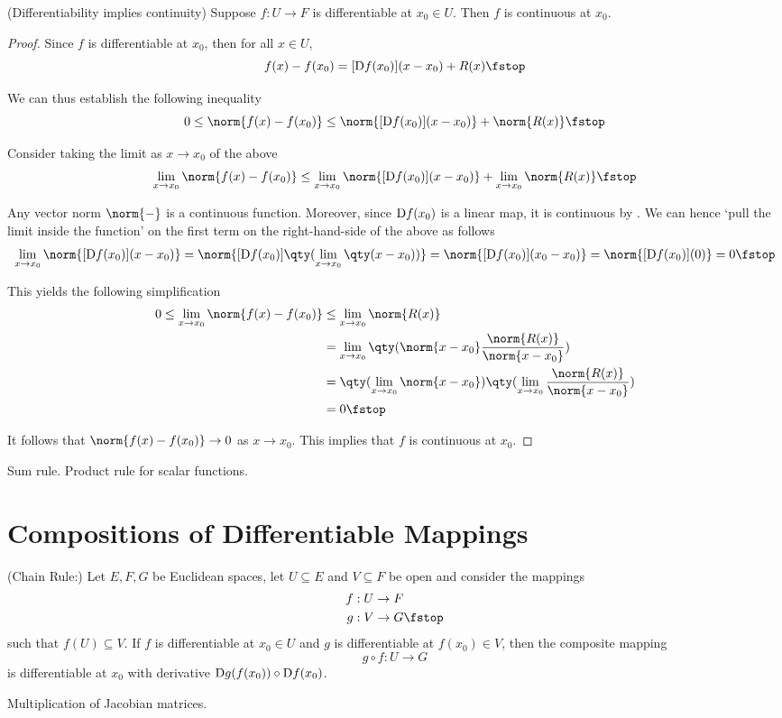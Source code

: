 \begin{theorem}
  (Differentiability implies continuity) Suppose \( f:U\to F \) is differentiable at \( x_0\in U \). Then \( f \) is continuous at \( x_0 \).
\end{theorem}
\begin{proof}
  Since \( f \) is differentiable at \( x_0 \), then for all \( x\in U \),
  \[ f(x)-f(x_0)=[\D f(x_0)](x-x_0)+R(x)\fstop \]

  We can thus establish the following inequality
  \[ 0\leq\norm{f(x)-f(x_0)}\leq\norm{[\D f(x_0)](x-x_0)}+\norm{R(x)}\fstop \]

  Consider taking the limit as \( x\to x_0 \) of the above
  \begin{equation*}
    \lim_{x\to x_0}\norm{f(x)-f(x_0)}\leq \lim_{x\to x_0}\norm{[\D f(x_0)](x-x_0)}+\lim_{x\to x_0}\norm{R(x)}\fstop
  \end{equation*}

  Any vector norm \( \norm{-} \) is a continuous function. Moreover, since \( \text{D} f(x_0) \) is a linear map, it is continuous by . We can hence `pull the limit inside the function' on the first term on the right-hand-side of the above as follows
  \[ \lim_{x\to x_0}\norm{[\D f(x_0)](x-x_0)}=\norm{[\D f(x_0)]\qty(\lim_{x\to x_0}\qty(x-x_0))}=\norm{[\D f(x_0)](x_0-x_0)}=\norm{[\D f(x_0)](0)}=0\fstop \]

  This yields the following simplification
  \begin{align*}
    0\leq \lim_{x\to x_0}\norm{f(x)-f(x_0)}&\leq \lim_{x\to x_0}\norm{R(x)}\\
    &= \lim_{x\to x_0}\qty(\norm{x-x_0}\frac{\norm{R(x)}}{\norm{x-x_0}})\\
    &= \qty(\lim_{x\to x_0}\norm{x-x_0})\qty(\lim_{x\to x_0}\frac{\norm{R(x)}}{\norm{x-x_0}})\\
    &= 0\fstop
  \end{align*}

  It follows that \( \norm{f(x)-f(x_0)}\to 0 \) as \( x\to x_0 \). This implies that \( f \) is continuous at \( x_0\).
\end{proof}

Sum rule. Product rule for scalar functions.

\section{Compositions of Differentiable Mappings}
\begin{theorem}
  (Chain Rule:) Let \( E, F, G \) be Euclidean spaces, let \( U\subseteq E \) and \( V\subseteq F \) be open and consider the mappings
  \begin{align*}
    f&:U\to F\\
    g&:V\to G\fstop
  \end{align*}
  such that \( f(U)\subseteq V \). If \( f \) is differentiable at \( x_0\in U \) and \( g \) is differentiable at \( f(x_0)\in V \), then the composite mapping
  \[ g\circ f:U\to G \]
  is differentiable at \( x_0 \) with derivative \( \text{D} g(f(x_0))\circ\text{D} f(x_0) \).
\end{theorem}
Multiplication of Jacobian matrices.

